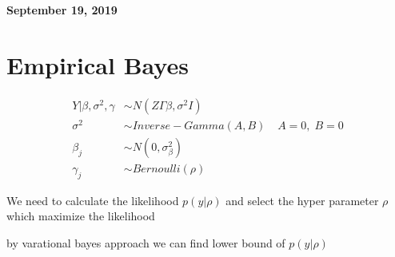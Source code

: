 \documentclass[11pt]{article}
\begin{document}
	
	
	
	\newcommand{\Ito}{$It\hat{o}$'$s~Lemma$}
	
	\newcommand\ind{\stackrel{\rm ind}{\sim}}
	\newcommand\iid{\stackrel{\rm iid}{\sim}}
	\renewcommand\c{\mathbf{c}}
	\newcommand\y{\mathbf{y}}
	\newcommand\z{\mathbf{z}}
	\renewcommand\P{\mathbf{P}}
	\newcommand\W{\mathbf{W}}
	\newcommand\X{\mathbf{X}}
	\newcommand\Y{\mathbf{Y}}
	\newcommand\Z{\mathbf{Z}}
	\newcommand\J{{\cal J}}
	\newcommand\B{{\cal B}}
	\newcommand\K{{\cal K}}
	\newcommand\N{{\rm N}}
	\newcommand\bs{\boldsymbol}
	\newcommand\bth{\bs\theta}
	\newcommand\bbe{\bs\beta}
	\renewcommand\*{^\star}
	
	\def\spacingset#1{\renewcommand{\baselinestretch}%
		{#1}\small\normalsize} \spacingset{1}
	
	
	
	\bigskip
	\bigskip
	\bigskip
	\begin{center}
		{\LARGE\bf September 19, 2019 }
	\end{center}
	\medskip
	
	
	
	\spacingset{1.45}
	
	
	
	\section{Empirical Bayes}
	
	\begin{align*}
		Y|\beta,\sigma^2 ,\gamma &\sim N(Z\Gamma\beta , \sigma^2 I)\\
		\sigma^2 &\sim Inverse-Gamma(A,B)  \;\;\;\ A=0,\;B=0\\
		\beta_j &\sim N(0, \sigma_{\beta}^2)\\
		\gamma_j &\sim Bernoulli(\rho)
	\end{align*}
	
	We need to calculate the likelihood $p(y|\rho)$ and select the hyper parameter $\rho$ which maximize the likelihood
	
	by varational bayes approach we can find lower bound of $p(y|\rho)$
	
\end{document}
